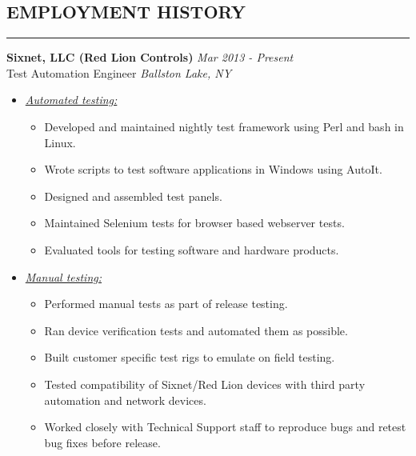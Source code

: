 \documentclass{article}
\begin{document}
\subsection*{\MakeUppercase{\bf Employment History}}
    \hrule
    \bigskip
    {\bf Sixnet, LLC (Red Lion Controls)} \hfill {\em Mar 2013 - Present} \\
    Test Automation Engineer \hfill {\em Ballston Lake, NY} \\
    \begin{itemize}
    \item \underline{\it Automated testing:}
          \begin{itemize}
          \item Developed and maintained nightly test framework using Perl
                and bash in Linux.
          \item Wrote scripts to test software applications in Windows using
                AutoIt.
          \item Designed and assembled test panels.
          \item Maintained Selenium tests for browser based webserver tests.
          \item Evaluated tools for testing software and hardware products.
          \end{itemize}
    \item \underline{\it Manual testing:}
          \begin{itemize}
          \item Performed manual tests as part of release testing.
          \item Ran device verification tests and automated them as possible.
          \item Built customer specific test rigs to emulate on field testing.
          \item Tested compatibility of Sixnet/Red Lion devices with third
                party automation and network devices.
          \item Worked closely with Technical Support staff to reproduce bugs
                and retest bug fixes before release.
          \end{itemize}
    \end{itemize}
    \bigskip
\end{document}
